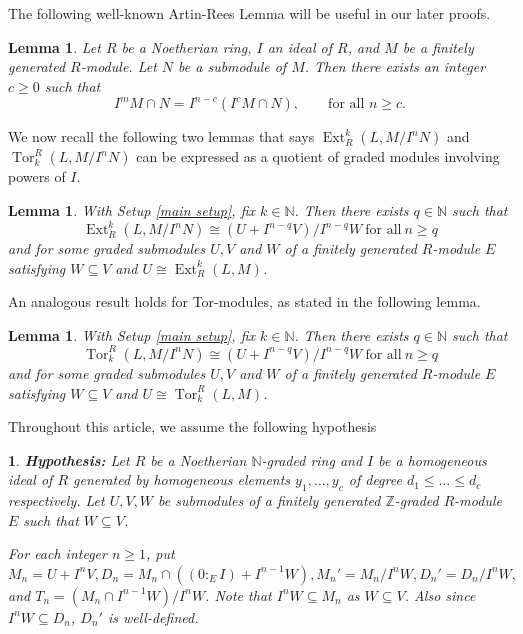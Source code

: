 \documentclass[11pt,reqno]{amsart}
\newtheorem{lemma}[theorem]{Lemma}
\newtheorem{point}[theorem]{}
\theoremstyle{definition}
\newcommand{\Z}{\mathbb{Z}}
\newcommand{\N}{\mathbb{N}}
\newcommand{\Ext}{\operatorname{Ext}}
\newcommand{\Tor}{\operatorname{Tor}}
\begin{document}
The following well-known Artin-Rees Lemma will be useful in our later proofs.
\begin{lemma}\cite[Theorem 17.1.6]{HS06}\label{Artin-Ress}
    Let $R$ be a Noetherian ring, $I$ an ideal of $R$, and $M$ be a finitely generated $R$-module. Let $N$ be a submodule of $M$. Then there exists an integer $c\geq 0$ such that 
    $$I^mM\cap N =I^{n-c}(I^cM\cap N),\qquad  \text{for all $n\geq c.$}$$
\end{lemma}


We now recall the following two lemmas that says $\Ext^k_R(L,M/I^nN)$ and $\Tor_k^R(L,M/I^nN)$ can be expressed as a quotient of graded modules involving powers of $I$.
\begin{lemma}\cite[Lemma 3.3]{GP25}\label{ext lemma}
    With Setup \ref{main setup}, fix $k\in \N$. Then there exists $q\in \N$ such that
    $$\Ext^k_R(L,M/I^nN)\cong (U+I^{n-q}V)/I^{n-q}W \ \text{for all}\ n\geq q$$
    and for some graded submodules $U,V$ and $W$ of a finitely generated $R$-module $E$ satisfying $W\subseteq V$ and $U\cong \Ext^k_R(L,M)$.
\end{lemma}
An analogous result holds for Tor-modules, as stated in the following lemma.
\begin{lemma}\cite[Lemma 3.4]{GP25}\label{tor lemma}
    With Setup \ref{main setup}, fix $k\in \N$. Then there exists $q\in \N$ such that
    $$\Tor_k^R(L,M/I^nN)\cong (U+I^{n-q}V)/I^{n-q}W \ \text{for all}\ n\geq q$$
    and for some graded submodules $U,V$ and $W$ of a finitely generated $R$-module $E$ satisfying $W\subseteq V$ and $U\cong \Tor_k^R(L,M)$.
\end{lemma}

Throughout this article, we assume the following hypothesis

\begin{point}\label{hypo}
    \normalfont
\textbf{Hypothesis:}  Let $R$ be a Noetherian $\N$-graded ring and $I$ be a homogeneous ideal of $R$ generated by homogeneous elements $y_1,\ldots, y_c$ of degree $d_1\leq \ldots \leq d_c$ respectively. Let $U,V,W$ be submodules of a finitely generated $\Z$-graded $R$-module $E$ such that $W\subseteq V$. 

For each integer $n\geq 1$, put
$M_n=U+I^nV, D_n=
M_n\cap\left((0:_E I)+I^{n-1}W\right), M_n'=M_n/I^nW, D_n'=D_n/I^nW,$ and $T_n=(M_n\cap I^{n-1}W)/I^nW$. Note that $I^nW\subseteq M_n$ as $W\subseteq V$. Also since $I^nW\subseteq D_n$, 
$D_n'$ is well-defined.
\end{point}
\end{document}
